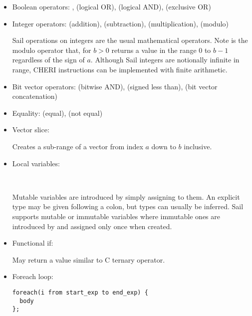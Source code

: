 \begin{itemize}
\item \label{sailRISCVznot}Boolean operators:
, \isail{|} (logical OR), \isail{&} (logical AND), \isail{^} (exclusive OR)

\item Integer operators:
\isail{+} (addition), \isail{-} (subtraction), \isail{*} (multiplication), \isail{\%} (modulo)

Sail operations on integers are the usual mathematical operators. Note  is the modulo operator that, for $b > 0$ returns a value in the range $0$ to $b-1$ regardless of the sign of $a$. Although Sail integers are notionally infinite in range, CHERI instructions can be implemented with finite arithmetic.

\item Bit vector operators:
\isail{&} (bitwise AND),  (signed less than),  (bit vector concatenation)

\item Equality:
\isail{==} (equal), \isail{!=} (not equal)

\item Vector slice:


Creates a sub-range of a vector from index $a$ down to $b$ inclusive.

\item Local variables:

   \\

Mutable variables are introduced by simply assigning to them. An explicit type may be given following a colon, but types can usually be inferred. Sail supports mutable or immutable variables where immutable ones are introduced by  and assigned only once when created.

\item Functional if:


May return a value similar to C ternary operator.


\item Foreach loop:

\begin{lstlisting}[language=sail,label=sailRISCVzto]
foreach(i from start_exp to end_exp) {
  body
};
\end{lstlisting}


\end{itemize}

